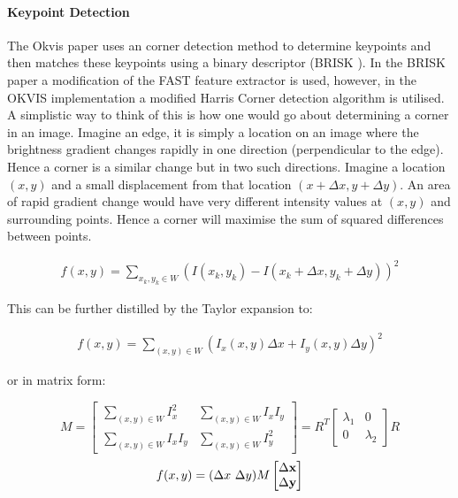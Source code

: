 \documentclass[11pt,twoside]{report}
\begin{document}
\paragraph{Keypoint Detection}

The Okvis \cite{Okvis_1} paper uses an corner detection method to determine keypoints and then matches these keypoints using a binary descriptor (BRISK \cite{BRISK}). In the BRISK paper a modification of the FAST feature extractor is used, however, in the OKVIS implementation a modified Harris Corner detection algorithm is utilised. A simplistic way to think of this is how one would go about determining a corner in an image. Imagine an edge, it is simply a location on an image where the brightness gradient changes rapidly in one direction (perpendicular to the edge). Hence a corner is a similar change but in two such directions. Imagine a location $(x,y)$ and a small displacement from that location $(x+ \Delta x, y + \Delta y)$. An area of rapid gradient change would have very different intensity values at $(x,y)$ and surrounding points. Hence a corner will maximise the sum of squared differences between points.

\begin{equation}
\begin{aligned}
f(x,y) = \sum_{x_{k},y_{k} \in W} (I(x_{k},y_{k}) - I(x_{k} + \Delta x,y_{k} + \Delta y))^{2}
\end{aligned}
\end{equation}

This can be further distilled by the Taylor expansion to:

\begin{equation}
\begin{aligned}
f(x,y) = \sum_{(x,y)\in W} (I_{x}(x,y) \Delta x + I_{y}(x,y) \Delta y )^{2}
\end{aligned}
\end{equation}

or in matrix form:

\begin{equation}
M = 
\begin{bmatrix}
\sum_{(x,y) \in W} I_{x}^{2} & \sum_{(x,y) \in W} I_{x}I_{y} \\
\sum_{(x,y)\in W} I_{x}I_{y}& 
\sum_{(x,y)\in W} I_{y}^{2}
\end{bmatrix} = 
R^{T}
\begin{bmatrix}
\lambda_{1} & 0 \\
0 & \lambda_{2}
\end{bmatrix}
R
\end{equation}
\begin{equation}
f(x,y) = (\Delta x \textnormal{ } \Delta y) M 
\begin{bmatrix}
\Delta \mathbf{x} \\
\Delta \mathbf{y}
\end{bmatrix}
\end{equation}
\end{document}
